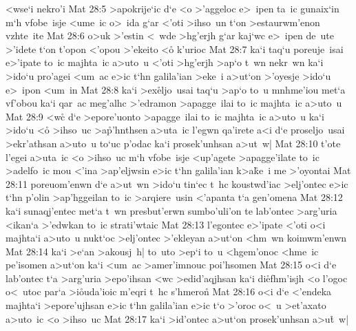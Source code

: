 <wse`i
nekro'i\bibvsend
\vs Mat 28:5
>apokrije`ic
d`e
<o
>'aggeloc
e>~ipen
ta~ic
gunaix`in
m`h
vfobe~isje
<ume~ic
o>~ida
g`ar
<'oti
>ihso~un
t`on
>estaurwm'enon
vzhte~ite\bibvsend
\vs Mat 28:6
o>uk
>'estin
<~wde
>hg'erjh
g`ar
kaj`wc
e>~ipen
de~ute
>'idete
t`on
t'opon
<'opou
>'ekeito
<o\r{}
k'urioc\bibvsend
\vs Mat 28:7
ka`i
taq`u
poreuje~isai
e>'ipate
to~ic
majhta~ic
a>uto~u
<'oti
>hg'erjh
>ap`o
t~wn
nekr~wn
ka`i
>ido`u
pro'agei
<um~ac
e>ic
t`hn
galila'ian
>eke~i
a>ut`on
>'oyesje
>ido`u
e>~ipon
<um~in\bibvsend
\vs Mat 28:8
ka`i
>ex\r{e}ljo~usai
taq`u
>ap`o
to~u
mnhme'iou
met`a
vf'obou
ka`i
qar~ac
meg'alhc
>'edramon
>apagge~ilai
to~ic
majhta~ic
a>uto~u\bibvsend
\vs Mat 28:9
<wc\r{}
d`e
>epore'uonto
>apagge~ilai
to~ic
majhta~ic
a>uto~u
ka`i
>ido`u
<o\r{}
>ihso~uc
>a\r{p}'hnthsen
a>uta~ic
l'egwn
qa'irete
a<i
d`e
proseljo~usai
>ekr'athsan
a>uto~u
to`uc
p'odac
ka`i
prosek'unhsan
a>ut~w|\bibvsend
\vs Mat 28:10
t'ote
l'egei
a>uta~ic
<o
>ihso~uc
m`h
vfobe~isje
<up'agete
>apagge'ilate
to~ic
>adelfo~ic
mou
<'ina
>ap'eljwsin
e>ic
t`hn
galila'ian
k>a\r{k}e~i
me
>'oyontai\bibvsend
\vs Mat 28:11
poreuom'enwn
d`e
a>ut~wn
>ido`u
tin`ec
t~hc
koustwd'iac
>elj'ontec
e>ic
t`hn
p'olin
>ap'hggeilan
to~ic
>arqiere~usin
<'apanta
t`a
gen'omena\bibvsend
\vs Mat 28:12
ka`i
sunaqj'entec
met`a
t~wn
presbut'erwn
sumbo'uli'on
te
lab'ontec
>arg'uria
<ikan`a
>'edwkan
to~ic
strati'wtaic\bibvsend
\vs Mat 28:13
l'egontec
e>'ipate
<'oti
o<i
majhta`i
a>uto~u
nukt`oc
>elj'ontec
>'ekleyan
a>ut`on
<hm~wn
koimwm'enwn\bibvsend
\vs Mat 28:14
ka`i
>e`an
>akousj~h|
to~uto
>ep`i
to~u
<hgem'onoc
<hme~ic
pe'isomen
a>ut`on
ka`i
<um~ac
>amer'imnouc
poi'hsomen\bibvsend
\vs Mat 28:15
o<i
d`e
lab'ontec
t`a
>arg'uria
>epo'ihsan
<wc
>edid'aqjhsan
ka`i
di\r{e}fhm'isjh
<o
l'ogoc
o<~utoc
par`a
>i\r{o}uda'ioic
m'eqri
t~hc
s'hmero\r{n}\bibvsend
{}
\vs Mat 28:16
o<i
d`e
<'endeka
majhta`i
>epore'ujhsan
e>ic
t`hn
galila'ian
e>ic
t`o
>'oroc
o<~u
>et'axato
a>uto~ic
<o
>ihso~uc\bibvsend
\vs Mat 28:17
ka`i
>id'ontec
a>ut`on
prosek'unhsan
a>u\r{t}~w|
